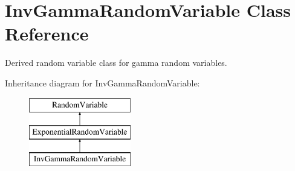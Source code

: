 \section{Inv\+Gamma\+Random\+Variable Class Reference}
\label{classPecos_1_1InvGammaRandomVariable}


Derived random variable class for gamma random variables.  


Inheritance diagram for Inv\+Gamma\+Random\+Variable\+:\begin{figure}[H]
\begin{center}
\leavevmode
\includegraphics[height=3.000000cm]{classPecos_1_1InvGammaRandomVariable}
\end{center}
\end{figure}
